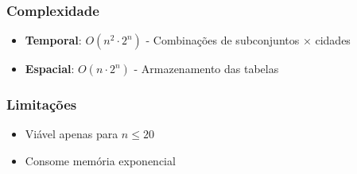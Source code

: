 \subsubsection{Complexidade}
\begin{itemize}
\item \textbf{Temporal}: $O(n^2 \cdot 2^n)$ - Combinações de subconjuntos × cidades
\item \textbf{Espacial}: $O(n \cdot 2^n)$ - Armazenamento das tabelas
\end{itemize}

\subsubsection{Limitações}
\begin{itemize}
\item Viável apenas para $n \leq 20$
\item Consome memória exponencial
\end{itemize}